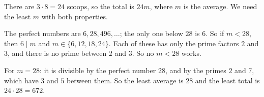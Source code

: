 There are $3\cdot8=24$ scoops, so the total is $24m$, where $m$ is the average. We need the least $m$ with both properties.

The perfect numbers are $6,28,496,\dots$; the only one below $28$ is $6$. So if $m<28$, then $6\mid m$ and $m\in\{6,12,18,24\}$. Each of these has only the prime factors $2$ and $3$, and there is no prime between $2$ and $3$. So no $m<28$ works.

For $m=28$: it is divisible by the perfect number $28$, and by the primes $2$ and $7$, which have $3$ and $5$ between them. So the least average is $28$ and the least total is $24\cdot28=\boxed{672}$.
